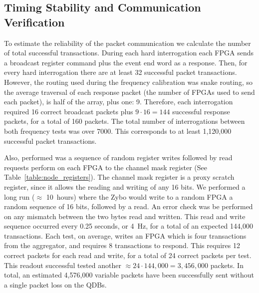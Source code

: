 




\subsection{Timing Stability and Communication Verification}
\label{sec:timing_test_results}
To estimate the reliability of the packet communication we calculate the number of total successful transactions.
During each hard interrogation each FPGA sends a broadcast register command plus the event end word as a response.
Then, for every hard interrogation there are at least 32 successful packet transactions. 
However, the routing used during the frequency calibration was snake routing, so the average traversal of each response packet (the number of FPGAs used to send each packet), is half of the array, plus one: 9.
Therefore, each interrogation required 16 correct broadcast packets plus $9\cdot 16 = 144$ successful response packets, for a total of 160 packets.
The total number of interrogations between both frequency tests was over 7000.
This corresponds to at least 1,120,000 successful packet transactions.

Also, performed was a sequence of random register writes followed by read requests perform on each FPGA to the channel mask register (See Table~\ref{table:node_registers}).
The channel mask register is a proxy scratch register, since it allows the reading and writing of any 16 bits.
We performed a long run ($\approx$ 10~\unit{hours}) where the Zybo would write to a random FPGA a random sequence of 16 bits, followed by a read.
An error check was be performed on any mismatch between the two bytes read and written.
This read and write sequence occurred every 0.25 seconds, or 4~\unit{Hz}, for a total of an expected 144,000 transactions.
Each test, on average, writes an FPGA which is four transactions from the aggregator, and requires 8 transactions to respond.
This requires 12 correct packets for each read and write, for a total of 24 correct packets per test.
This readout successful tested another $\approx 24\cdot 144,000 = 3,456,000$ packets.
In total, an estimated 4,576,000 variable packets have been successfully sent without a single packet loss on the QDBs.

